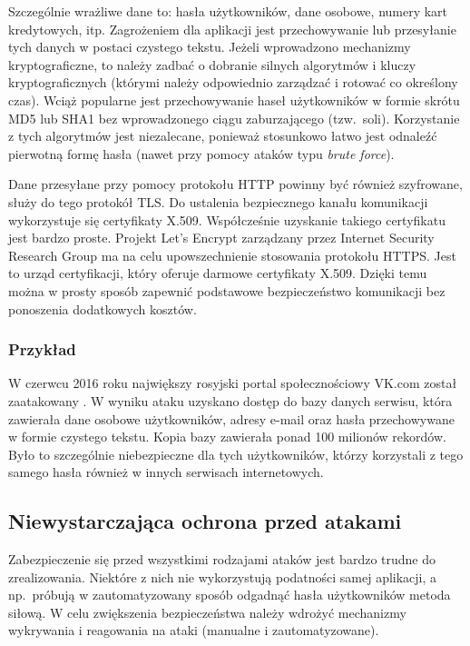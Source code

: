\documentclass[11pt,a4paper,polish,thesis]{dcsbook}
\begin{document}
Szczególnie wrażliwe dane to: hasła użytkowników, dane osobowe, numery kart kredytowych, itp. Zagrożeniem dla aplikacji jest przechowywanie lub przesyłanie tych danych w postaci czystego tekstu. Jeżeli wprowadzono mechanizmy kryptograficzne, to należy zadbać o dobranie silnych algorytmów i kluczy kryptograficznych (którymi należy odpowiednio zarządzać i rotować co określony czas). Wciąż popularne jest przechowywanie haseł użytkowników w formie skrótu MD5 lub SHA1 bez wprowadzonego ciągu zaburzającego (tzw.~soli). Korzystanie z tych algorytmów jest niezalecane, ponieważ stosunkowo łatwo jest odnaleźć pierwotną formę hasła (nawet przy pomocy ataków typu \textit{brute force}). 

Dane przesyłane przy pomocy protokołu HTTP powinny być również szyfrowane, służy do tego protokół TLS. Do ustalenia bezpiecznego kanału komunikacji wykorzystuje się certyfikaty X.509. Współcześnie uzyskanie takiego certyfikatu jest bardzo proste. Projekt Let's Encrypt zarządzany przez Internet Security Research Group ma na celu upowszechnienie stosowania protokołu HTTPS. Jest to urząd certyfikacji, który oferuje darmowe certyfikaty X.509. Dzięki temu można w prosty sposób zapewnić podstawowe bezpieczeństwo komunikacji bez ponoszenia dodatkowych kosztów.

\subsubsection*{Przykład}
W czerwcu 2016 roku największy rosyjski portal społecznościowy VK.com został zaatakowany \cite{vk}. W wyniku ataku uzyskano dostęp do bazy danych serwisu, która zawierała dane osobowe użytkowników, adresy e-mail oraz hasła przechowywane w formie czystego tekstu. Kopia bazy zawierała ponad 100 milionów rekordów. Było to szczególnie niebezpieczne dla tych użytkowników, którzy korzystali z tego samego hasła również w innych serwisach internetowych. 


\subsection{Niewystarczająca ochrona przed atakami}
Zabezpieczenie się przed wszystkimi rodzajami ataków jest bardzo trudne do zrealizowania. Niektóre z nich nie wykorzystują podatności samej aplikacji, a np.~próbują w zautomatyzowany sposób odgadnąć hasła użytkowników metoda siłową. W celu zwiększenia bezpieczeństwa należy wdrożyć mechanizmy wykrywania i reagowania na ataki (manualne i zautomatyzowane).
\end{document}
